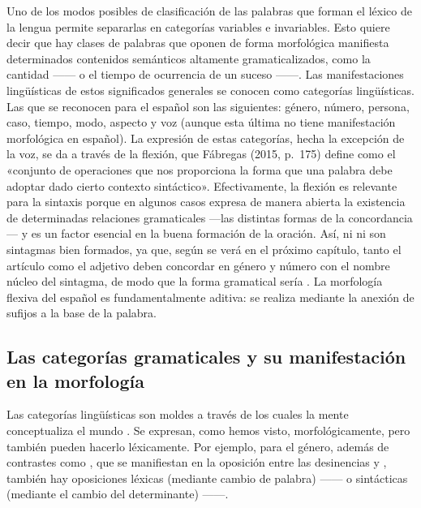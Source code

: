 Uno de los modos posibles de clasificación de las palabras que forman el léxico
de la lengua permite separarlas en categorías variables e invariables. Esto
quiere decir que hay clases de palabras que oponen de forma morfológica
manifiesta determinados contenidos semánticos altamente gramaticalizados, como
la cantidad ------ o el tiempo de ocurrencia de un suceso
------. Las manifestaciones lingüísticas de estos
significados generales se conocen como categorías lingüísticas. Las que se
reconocen para el español son las siguientes: género, número, persona, caso,
tiempo, modo, aspecto y voz (aunque esta última no tiene manifestación
morfológica en español). La expresión de estas categorías, hecha la excepción de
la voz, se da a través de la flexión, que Fábregas (2015, p.~175) define como el «conjunto de operaciones que
nos proporciona la forma que una palabra debe adoptar dado cierto contexto
sintáctico». Efectivamente, la flexión es relevante para la sintaxis porque en
algunos casos expresa de manera abierta la existencia de determinadas relaciones
gramaticales ---las distintas formas de la concordancia--- y es un factor
esencial en la buena formación de la oración. Así, ni  ni  son sintagmas bien formados, ya
que, según se verá en el próximo capítulo, tanto el artículo como el adjetivo
deben concordar en género y número con el nombre núcleo del sintagma, de modo
que la forma gramatical sería . La morfología flexiva del
español es fundamentalmente aditiva: se realiza mediante la anexión de sufijos a
la base de la palabra.

\subsection{Las categorías gramaticales y su manifestación en la morfología}\label{sec:04-categorias}

Las categorías lingüísticas son moldes a través de los cuales la mente
conceptualiza el mundo \parencite[6]{lakoff1987}. Se expresan, como hemos
visto, morfológicamente, pero también pueden hacerlo léxicamente. Por ejemplo,
para el género, además de contrastes como , que se
manifiestan en la oposición entre las desinencias  y ,
también hay oposiciones léxicas (mediante cambio de palabra) ------
o sintácticas (mediante el cambio del determinante) ------.

